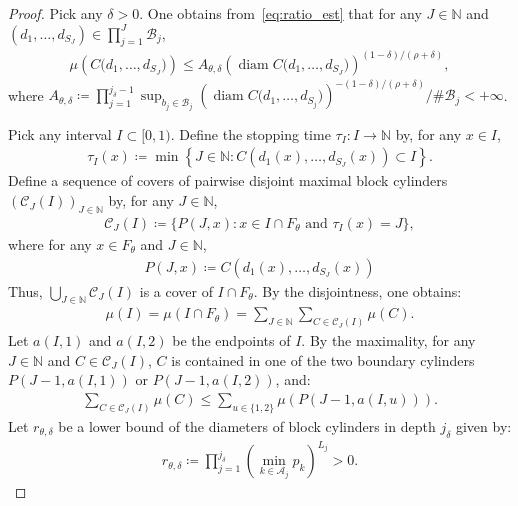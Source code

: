 \documentclass[12pt,reqno]{amsart}
\theoremstyle{definition}
\theoremstyle{plain}
\begin{document}
\begin{proof}
Pick any $\delta>0$. One obtains from~\eqref{eq:ratio_est} that for any $J\in\mathbb{N}$ and $(d_1,\ldots,d_{S_J})\in\prod_{j=1}^J\mathcal{B}_j$, 
\begin{align}
\label{eq: 2}
    \mu{\left(C{(d_1,\ldots,d_{S_J}})\right)}
    \leq A_{\theta,\delta}\left(\operatorname{diam}{C{(d_1,\ldots,d_{S_J}})}\right)^{(1-\delta)/(\rho+\delta)},
\end{align}
where $A_{\theta,\delta}\coloneqq\prod_{j=1}^{j_\delta-1}\sup_{b_j\in\mathcal{B}_j}(\operatorname{diam}{C{(d_1,\ldots,d_{S_j}})})^{-(1-\delta)/(\rho+\delta)}/\#\mathcal{B}_j<+\infty$.

Pick any interval $I\subset[0,1)$. Define the stopping time $\tau_I:I\to\mathbb{N}$ by, for any $x\in I$,
\begin{align*}
    \tau_I(x)
    \coloneqq
    \min{\left\{J\in\mathbb{N}:C{(d_1(x),\ldots,d_{S_J}(x))}\subset I\right\}}.
\end{align*}
Define a sequence of covers of pairwise disjoint maximal block cylinders $(\mathcal{C}_J(I))_{J\in\mathbb{N}}$ by, for any $J\in\mathbb{N}$,
\begin{align*}
    \mathcal{C}_J(I)\coloneqq\{P(J,x):x\in I\cap F_{\theta}\text{ and }\tau_I(x)=J\},
\end{align*}
where for any $x\in F_{\theta}$ and $J\in\mathbb{N}$,
\begin{align*}
    P(J,x)\coloneqq C{\left(d_1(x),\ldots,d_{S_J}(x)\right)}
\end{align*}
Thus, $\bigcup_{J\in\mathbb{N}}\mathcal{C}_J(I)$ is a cover of $I\cap F_{\theta}$. By the disjointness, one obtains:
\begin{align}
\label{eq: 3}
    \mu{(I)}=\mu{(I\cap F_\theta)}=\sum_{J\in\mathbb{N}}\sum_{C\in\mathcal{C}_J(I)}\mu(C).
\end{align}
Let $a(I,1)$ and $a(I,2)$ be the endpoints of $I$. By the maximality, for any $J\in\mathbb{N}$ and $C\in\mathcal{C}_J(I)$, $C$ is contained in one of the two boundary cylinders $P(J-1,a(I,1))$ or $P(J-1,a(I,2))$, and:
\begin{align}
\label{eq: 4}
    \sum_{C\in\mathcal{C}_J(I)}\mu(C)\leq \sum_{u\in\{1,2\}}\mu{\left(P(J-1,a(I,u))\right)}.
\end{align}
Let $r_{\theta,\delta}$ be a lower bound of the diameters of block cylinders in depth $j_\delta$ given by:
\begin{align*}
    r_{\theta,\delta}
    \coloneqq
    \prod_{j=1}^{j_\delta}\left(\min_{k\in\mathcal{A}_j}p_k\right)^{L_j}>0.
\end{align*}


\end{proof}
\end{document}
